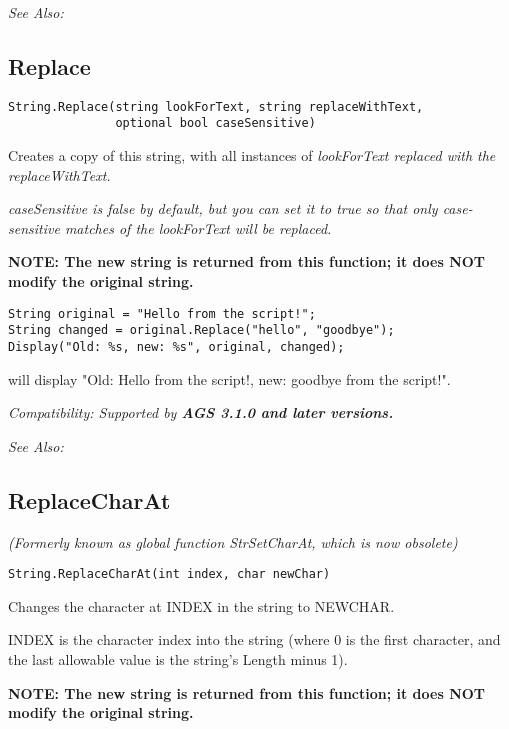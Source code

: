 \it{See Also:} 


\subsection{Replace}\label{String.Replace}%

\begin{verbatim}
String.Replace(string lookForText, string replaceWithText,
               optional bool caseSensitive)
\end{verbatim}
Creates a copy of this string, with all instances of \it{lookForText} replaced
with the \it{replaceWithText}.

\it{caseSensitive} is \it{false} by default, but you can set it to true so that only
case-sensitive matches of the \it{lookForText} will be replaced.

\bf{NOTE:} The new string is returned from this function; it
does \bf{NOT} modify the original string.

\begin{verbatim}
String original = "Hello from the script!";
String changed = original.Replace("hello", "goodbye");
Display("Old: %s, new: %s", original, changed);
\end{verbatim}
will display "Old: Hello from the script!, new: goodbye from the script!".

\it{Compatibility:} Supported by \bf{AGS 3.1.0} and later versions.

\it{See Also:} 


\subsection{ReplaceCharAt}\label{String.ReplaceCharAt}%

\it{(Formerly known as global function StrSetCharAt, which is now obsolete)}

\begin{verbatim}
String.ReplaceCharAt(int index, char newChar)
\end{verbatim}
Changes the character at INDEX in the string to NEWCHAR.

INDEX is the character index into the string (where 0 is the first character,
and the last allowable value is the string's Length minus 1).

\bf{NOTE:} The new string is returned from this function; it
does \bf{NOT} modify the original string.

